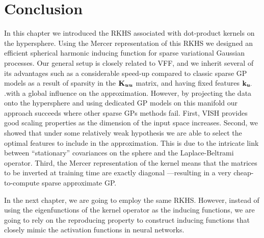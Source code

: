 \section{Conclusion}

In this chapter we introduced the RKHS associated with dot-product kernels on the hypersphere. Using the Mercer representation of this RKHS we designed an efficient spherical harmonic inducing function for sparse variational Gaussian processes. Our general setup is closely related to VFF, and we inherit several of its advantages such as a considerable speed-up compared to classic sparse GP models as a result of sparsity in the $\mathbf{{K}}_{\bm{u} \bm{u}}$ matrix, and having fixed features $\mathbf{k}_{\bm{u} \cdot}$ .with a global influence on the approximation. However, by projecting the data onto the hypersphere and using dedicated GP models on this manifold our approach succeeds where other sparse GPs methods fail. First, VISH provides good scaling properties as the dimension of the input space increases.  Second, we showed that under some relatively weak hypothesis we are able to select the optimal features to include in the approximation. This is due to the intricate link between ``stationary'' covariances on the sphere and the Laplace-Beltrami operator. Third, the Mercer representation of the kernel means that the matrices to be inverted at training time are exactly diagonal ---resulting in a very cheap-to-compute sparse approximate GP.

In the next chapter, we are going to employ the same RKHS. However, instead of using the eigenfunctions of the kernel operator as the inducing functions, we are going to rely on the reproducing property to construct inducing functions that closely mimic the activation functions in neural networks.